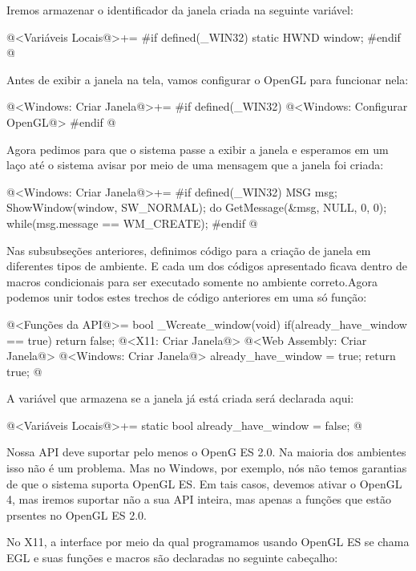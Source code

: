 Iremos armazenar o identificador da janela criada na seguinte
variável:

\iniciocodigo
@<Variáveis Locais@>+=
#if defined(_WIN32)
static HWND window;
#endif
@
\fimcodigo

Antes de exibir a janela na tela, vamos configurar o OpenGL para
funcionar nela:

\iniciocodigo
@<Windows: Criar Janela@>+=
#if defined(_WIN32)
@<Windows: Configurar OpenGL@>
#endif
@
\fimcodigo

Agora pedimos para que o sistema passe a exibir a janela e esperamos
em um laço até o sistema avisar por meio de uma mensagem que a janela
foi criada:

\iniciocodigo
@<Windows: Criar Janela@>+=
#if defined(_WIN32)
{
  MSG msg;
  ShowWindow(window, SW_NORMAL);
  do{
    GetMessage(&msg, NULL, 0, 0);
  } while(msg.message == WM_CREATE);
}
#endif
@
\fimcodigo


Nas subsubseções anteriores, definimos código para a criação de janela
em diferentes tipos de ambiente. E cada um dos códigos apresentado
ficava dentro de macros condicionais para ser executado somente no
ambiente correto.Agora podemos unir todos estes trechos de código
anteriores em uma só função:

\iniciocodigo
@<Funções da API@>=
bool _Wcreate_window(void){
  if(already_have_window == true)
    return false;
  @<X11: Criar Janela@>
  @<Web Assembly: Criar Janela@>
  @<Windows: Criar Janela@>
  already_have_window = true;
  return true;
}
@
\fimcodigo

A variável que armazena se a janela já está criada será declarada
aqui:

\iniciocodigo
@<Variáveis Locais@>+=
static bool already_have_window = false;
@
\fimcodigo


Nossa API deve suportar pelo menos o OpenG ES 2.0. Na maioria dos
ambientes isso não é um problema. Mas no Windows, por exemplo, nós não
temos garantias de que o sistema suporta OpenGL ES. Em tais casos,
devemos ativar o OpenGL 4, mas iremos suportar não a sua API inteira,
mas apenas a funções que estão prsentes no OpenGL ES 2.0.


No X11, a interface por meio da qual programamos usando OpenGL ES se
chama EGL e suas funções e macros são declaradas no seguinte
cabeçalho:

